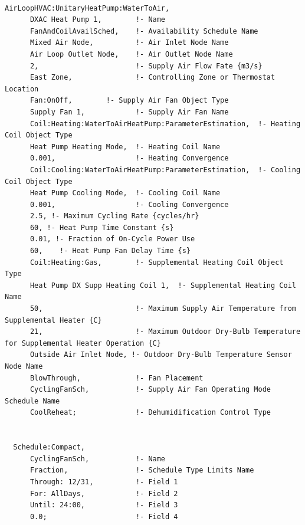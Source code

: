 \begin{lstlisting}

AirLoopHVAC:UnitaryHeatPump:WaterToAir,
      DXAC Heat Pump 1,        !- Name
      FanAndCoilAvailSched,    !- Availability Schedule Name
      Mixed Air Node,          !- Air Inlet Node Name
      Air Loop Outlet Node,    !- Air Outlet Node Name
      2,                       !- Supply Air Flow Fate {m3/s}
      East Zone,               !- Controlling Zone or Thermostat Location
      Fan:OnOff,        !- Supply Air Fan Object Type
      Supply Fan 1,            !- Supply Air Fan Name
      Coil:Heating:WaterToAirHeatPump:ParameterEstimation,  !- Heating Coil Object Type
      Heat Pump Heating Mode,  !- Heating Coil Name
      0.001,                   !- Heating Convergence
      Coil:Cooling:WaterToAirHeatPump:ParameterEstimation,  !- Cooling Coil Object Type
      Heat Pump Cooling Mode,  !- Cooling Coil Name
      0.001,                   !- Cooling Convergence
      2.5, !- Maximum Cycling Rate {cycles/hr}
      60, !- Heat Pump Time Constant {s}
      0.01, !- Fraction of On-Cycle Power Use
      60,    !- Heat Pump Fan Delay Time {s}
      Coil:Heating:Gas,        !- Supplemental Heating Coil Object Type
      Heat Pump DX Supp Heating Coil 1,  !- Supplemental Heating Coil Name
      50,                      !- Maximum Supply Air Temperature from Supplemental Heater {C}
      21,                      !- Maximum Outdoor Dry-Bulb Temperature for Supplemental Heater Operation {C}
      Outside Air Inlet Node, !- Outdoor Dry-Bulb Temperature Sensor Node Name
      BlowThrough,             !- Fan Placement
      CyclingFanSch,           !- Supply Air Fan Operating Mode Schedule Name
      CoolReheat;              !- Dehumidification Control Type


  Schedule:Compact,
      CyclingFanSch,           !- Name
      Fraction,                !- Schedule Type Limits Name
      Through: 12/31,          !- Field 1
      For: AllDays,            !- Field 2
      Until: 24:00,            !- Field 3
      0.0;                     !- Field 4





\end{lstlisting}

